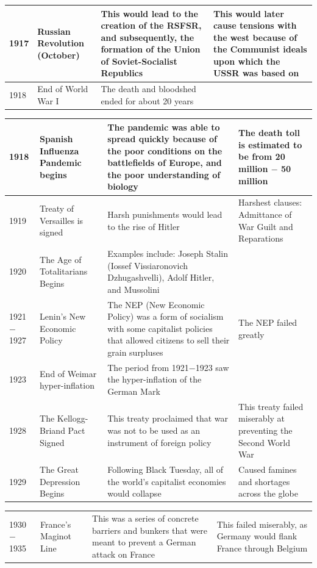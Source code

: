 \documentclass[12pt]{article}
\begin{document}
\begin{enumerate}
\begin{tabular}{|p{}|p{}|p{}|p{}|}
\hline
1917 & Russian Revolution (October)  & This would lead to the creation of the RSFSR, and subsequently, the formation of the Union of Soviet-Socialist Republics  & This would later cause tensions with the west because of the Communist ideals upon which the USSR was based on  \\
\hline
1918 & End of World War I & The death and bloodshed ended for about 20 years & \\
\hline
\end{tabular}
\newpage
\hspace{-25pt}\begin{tabular}{|p{}|p{}|p{}|p{}|}
\hline
1918 & Spanish Influenza Pandemic begins & The pandemic was able to spread quickly because of the poor conditions on the battlefields of Europe, and the poor understanding of biology  & The death toll is estimated to be from 20 million $-$ 50 million  \\
\hline
1919 & Treaty of Versailles is signed & Harsh punishments would lead to the rise of Hitler & Harshest clauses: Admittance of War Guilt and Reparations \\
\hline
1920 & The Age of Totalitarians Begins & Examples include: Joseph Stalin (Iossef Vissiaronovich Dzhugashvelli), Adolf Hitler, and Mussolini  & \\
\hline
1921$-$1927 & Lenin's New Economic Policy  & The NEP (New Economic Policy) was a form of socialism with some capitalist policies that allowed citizens to sell their grain surpluses  & The NEP failed greatly  \\
\hline
1923 & End of Weimar hyper-inflation  & The period from 1921$-$1923 saw the hyper-inflation of the German Mark  & \\
\hline
1928 & The Kellogg-Briand Pact Signed  & This treaty proclaimed that war was not to be used as an instrument of foreign policy  & This treaty failed miserably at preventing the Second World War  \\
\hline
1929 & The Great Depression Begins  & Following Black Tuesday, all of the world's capitalist economies would collapse   & Caused famines and shortages across the globe \\
\hline
\end{tabular}
\newpage
\hspace{-25pt}\begin{tabular}{|p{}|p{}|p{}|p{}|}
\hline
1930$-$1935 & France's Maginot Line  & This was a series of concrete barriers and bunkers that were meant to prevent a German attack on France  & This failed miserably, as Germany would flank France through Belgium  \\

\end{tabular}
\end{enumerate}
\end{document}
